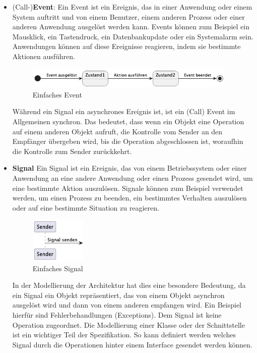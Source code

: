 \documentclass[../vs-script-first-v01.tex]{subfiles}
\begin{document}
\begin{itemize}  
\item (Call-)\textbf{Event}:
Ein Event ist ein Ereignis, das in einer Anwendung oder einem System auftritt und von einem Benutzer, einem anderen Prozess oder einer anderen Anwendung ausgelöst werden kann. Events können zum Beispiel ein Mausklick, ein Tastendruck, ein Datenbankupdate oder ein Systemalarm sein. Anwendungen können auf diese Ereignisse reagieren, indem sie bestimmte Aktionen ausführen.
\begin{figure}[!ht]
  \centering
  \includegraphics[width=0.95\textwidth]{fig/uml/simple-event.png}
  \caption{Einfaches Event}
  \label{fig:simple-event}
\end{figure}
Während ein Signal ein asynchrones Ereignis ist, ist ein (Call) Event im Allgemeinen synchron. Das bedeutet, dass wenn ein Objekt eine Operation auf einem anderen Objekt aufruft, die Kontrolle vom Sender an den Empfänger übergeben wird, bis die Operation abgeschlossen ist, woraufhin die Kontrolle zum Sender zurückkehrt. 

\item \textbf{Signal}\:
Ein Signal ist ein Ereignis, das von einem Betriebssystem oder einer Anwendung an eine andere Anwendung oder einen Prozess gesendet wird, um eine bestimmte Aktion auszulösen. Signale können zum Beispiel verwendet werden, um einen Prozess zu beenden, ein bestimmtes Verhalten auszulösen oder auf eine bestimmte Situation zu reagieren.
\begin{figure}[!ht]
  \centering
  \includegraphics[width=0.25\textwidth]{fig/uml/simple-signal.png}
  \caption{Einfaches Signal}
  \label{fig:simple-signal}
\end{figure}
In der Modellierung der Architektur hat dies eine besondere Bedeutung, da ein Signal ein Objekt repräsentiert, das von einem Objekt asynchron ausgelöst wird und dann von einem anderen empfangen wird. Ein Beispiel hierfür sind Fehlerbehandlungen (Exceptions). Dem Signal ist keine Operation zugeordnet. Die Modellierung einer Klasse oder der Schnittstelle ist ein wichtiger Teil der Spezifikation. So kann definiert werden welches Signal durch die Operationen hinter einem Interface gesendet werden können.


\end{itemize}
\end{document}
